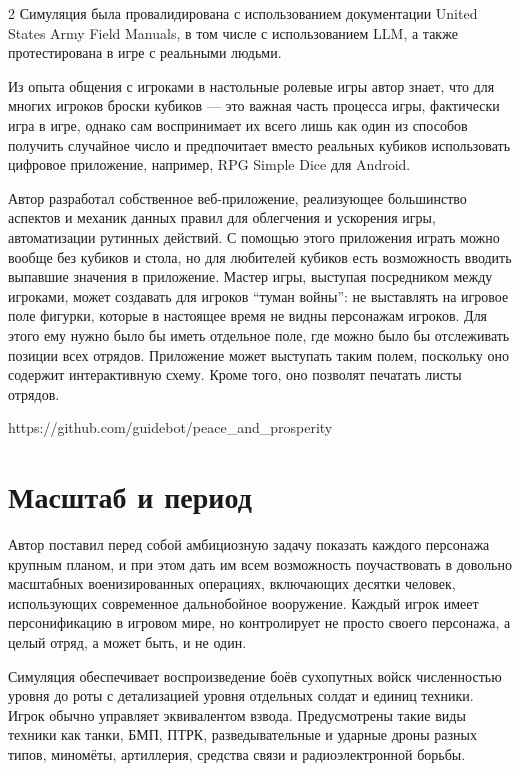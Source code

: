 \documentclass[twoside]{article}
\begin{document}
\begin{multicols}{2}
Симуляция была провалидирована с использованием документации United
States Army Field Manuals, в том числе с использованием LLM, а также
протестирована в игре с реальными людьми.

Из опыта общения с игроками в настольные ролевые игры автор знает, что для многих игроков броски кубиков --- это важная
часть процесса игры, фактически игра в игре, однако сам воспринимает их
всего лишь как один из способов получить случайное число и предпочитает
вместо реальных кубиков использовать цифровое приложение, например, RPG Simple Dice для Android.

Автор разработал собственное веб-приложение, реализующее большинство аспектов и механик данных правил для облегчения и ускорения игры, автоматизации рутинных действий.
С помощью этого приложения играть можно вообще без кубиков и стола, но для любителей кубиков
есть возможность вводить выпавшие значения в приложение. Мастер игры, выступая посредником между
игроками, может создавать для игроков ``туман войны'': не выставлять на игровое поле фигурки,
которые в настоящее время не видны персонажам игроков. Для этого ему нужно было бы иметь
отдельное поле, где можно было бы отслеживать позиции всех отрядов. Приложение может выступать
таким полем, поскольку оно содержит интерактивную схему. Кроме того, оно позволят печатать листы отрядов.

\begin{center}
https://github.com/guidebot/peace\_and\_prosperity
\end{center}

\section{Масштаб и период}\label{scale-period}

Автор поставил перед собой амбициозную задачу показать каждого персонажа
крупным планом, и при этом дать им всем возможность поучаствовать в
довольно масштабных военизированных операциях, включающих десятки
человек, использующих современное дальнобойное вооружение. Каждый игрок
имеет персонификацию в игровом мире, но контролирует не просто своего персонажа,
а целый отряд, а может быть, и не один.

Симуляция обеспечивает воспроизведение боёв сухопутных войск
численностью уровня до роты с детализацией уровня отдельных солдат и
единиц техники. Игрок обычно управляет эквивалентом взвода.
Предусмотрены такие виды техники как танки, БМП, ПТРК,
разведывательные и ударные дроны разных типов, миномёты, артиллерия,
средства связи и радиоэлектронной борьбы.


\end{multicols}
\end{document}
